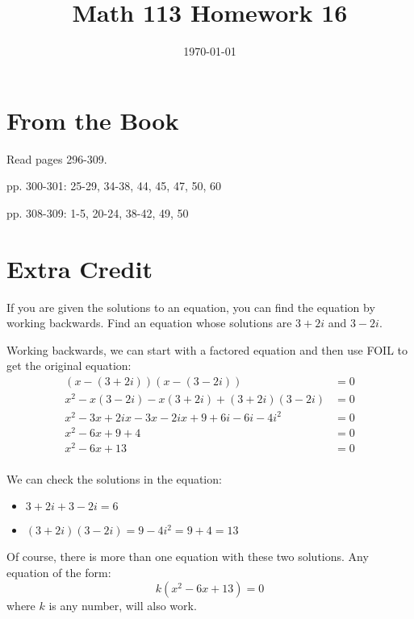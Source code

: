 \documentclass[fleqn,addpoints]{exam}
\title{Math 113 Homework 16}
\author{}
\date{\today}
\begin{document}
\maketitle

\section{From the Book}

Read pages 296-309.
\begin{itemize*}
  \item pp. 300-301: 25-29, 34-38, 44, 45, 47, 50, 60
  \item pp. 308-309: 1-5, 20-24, 38-42, 49, 50
\end{itemize*}

\section{Extra Credit}

If you are given the solutions to an equation, you can find the equation by working backwards.  Find an equation whose
solutions are $3 + 2i$ and $3-2i$.

\ifprintanswers
\pagebreak
\fi

\begin{solution}
Working backwards, we can start with a factored equation and then use FOIL to get the original equation:
\begin{align*}
  (x-(3+2i))(x-(3-2i)) &= 0 \\
  x^2 - x(3-2i) - x(3+2i)+(3+2i)(3-2i) &= 0 \\
  x^2 - 3x + 2ix - 3x - 2ix + 9 + 6i - 6i - 4i^2 &= 0 \\
  x^2 - 6x + 9 + 4 &= 0 \\
  x^2 - 6x + 13 &= 0 \\
\end{align*}

We can check the solutions in the equation:
\begin{itemize}
  \item $3+2i + 3 - 2i = 6$
  \item $(3+2i)(3 - 2i) = 9 - 4i^2 = 9 + 4 = 13$
\end{itemize}

Of course, there is more than one equation with these two solutions.  Any equation of the form:
\[ k(x^2 - 6x + 13) = 0 \]
 where $k$ is any number, will also work.

\end{solution}
\end{document}
